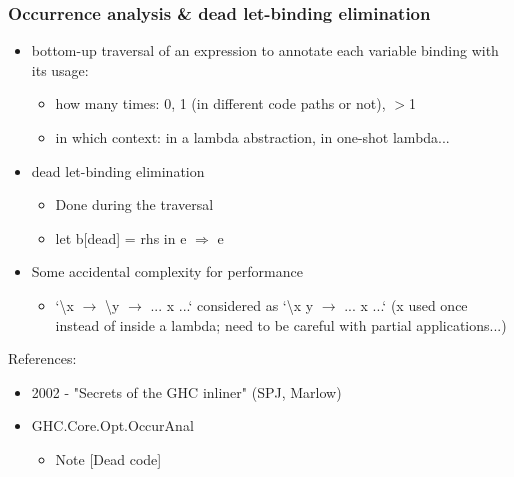 \documentclass[aspectratio=169]{beamer}
\begin{document}
\begin{frame}
  \frametitle{Occurrence analysis \& dead let-binding elimination}

  \begin{itemize}
    \item bottom-up traversal of an expression to annotate each variable binding
      with its usage:
      \begin{itemize}
        \item how many times: 0, 1 (in different code paths or not), $>$1
        \item in which context: in a lambda abstraction, in one-shot lambda...
      \end{itemize}
    \item dead let-binding elimination
      \begin{itemize}
        \item Done during the traversal
        \item let b[dead] = rhs in e $\Longrightarrow$ e
      \end{itemize}
    \item Some accidental complexity for performance
      \begin{itemize}
        \item `\textbackslash x $\rightarrow$ \textbackslash y $\rightarrow$
          ... x ...` considered as `\textbackslash x y $\rightarrow$ ... x
          ...` (x used once instead of inside a lambda; need to be careful with
          partial applications...)
      \end{itemize}
  \end{itemize}

  References:
  \begin{itemize}
    \item 2002 - "Secrets of the GHC inliner" (SPJ, Marlow)
    \item GHC.Core.Opt.OccurAnal
      \begin{itemize}
        \item Note [Dead code]
      \end{itemize}
  \end{itemize}

\end{frame}
\end{document}
